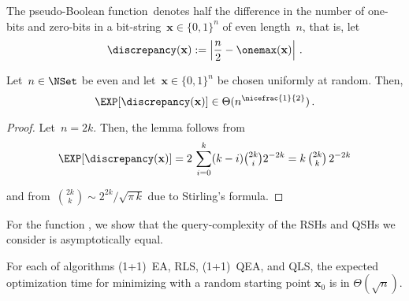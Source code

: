 The pseudo-Boolean function~\discrepancy denotes half the difference in the number of one-bits and zero-bits in a bit-string~$\mathbf{x}\in\{0,1\}^n$ of even length~$n$, that is, let
\begin{equation}
\discrepancy(\mathbf{x}):=\left|\frac{n}{2}-\onemax(\mathbf{x})\right|\,.
\end{equation}


\begin{lemma}\label{lem:discrepancyofX0}
Let~$n\in\NSet$ be even and let~$\mathbf{x}\in\{0,1\}^n$ be chosen uniformly at random. Then,
\[
\EXP[\discrepancy(\mathbf{x})]\in\Theta(n^{\nicefrac{1}{2}})\,.
\]
\end{lemma}

\begin{proof}
Let~$n=2k$. Then, the lemma follows from
\[
\EXP[\discrepancy(\mathbf{x})]=2\,\sum_{i=0}^k(k-i)\tbinom{2k}{i}2^{-2k}=k\,\tbinom{2k}{k}\,2^{-2k}
\]
and from~$\binom{2k}{k}\sim 2^{2k}/\sqrt{\pi\,k}$ due to Stirling's formula.
\end{proof}

For the function \discrepancy, we show that the query-complexity of the RSHs and QSHs we consider is asymptotically equal.
\begin{theorem}
%
For each of algorithms (1+1)~EA, RLS, (1+1)~QEA, and QLS, the expected optimization time for minimizing \discrepancy with a random starting point $\mathbf{x}_0$  is in $\Theta(\sqrt{n})$.
\end{theorem}

